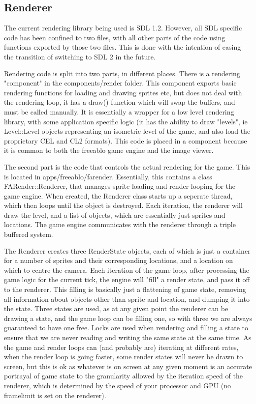 \documentclass[a4paper]{article}
\begin{document}
    \subsection{Renderer}
    The current rendering library being used is SDL 1.2. However, all SDL specific code has been confined to two files, with all other parts of the code using functions exported by those two files. This is done with the intention of easing the transition of switching to SDL 2 in the future.
    
    Rendering code is split into two parts, in different places. There is a rendering "component" in the components/render folder.
    This component exports basic rendering functions for loading and drawing sprites etc, but does not deal with the rendering loop, it has a draw() function which will swap the buffers, and must be called manually.   
    It is essentially a wrapper for a low level rendering library, with some application specific logic (it has the ability to draw "levels", ie Level::Level objects representing an isometric level of the game, and also load the proprietary CEL and CL2 formats).
    This code is placed in a component because it is common to both the freeablo game engine and the image viewer.
    
    \mbox{}
    
    The second part is the code that controls the actual rendering for the game. This is located in apps/freeablo/farender. Essentially, this contains a class FARender::Renderer, that manages sprite loading and render looping for the game engine.  
    When created, the Renderer class starts up a seperate thread, which then loops until the object is destroyed. Each iteration, the renderer will draw the level, and a list of objects, which are essentially just sprites and locations.
    The game engine communicates with the renderer through a triple buffered system.
    
    The Renderer creates three RenderState objects, each of which is just a container for a number of sprites and their corresponding locations, and a location on which to centre the camera.
    Each iteration of the game loop, after processing the game logic for the current tick, the engine will "fill" a render state, and pass it off to the renderer. This filling is basically just a flattening of game state, removing all information about objects other than sprite and location, and dumping it into the state.
    Three states are used, as at any given point the renderer can be drawing a state, and the game loop can be filling one, so with three we are always guaranteed to have one free.
    Locks are used when rendering and filling a state to ensure that we are never reading and writing the same state at the same time.
    As the game and render loops can (and probably are) iterating at different rates, when the render loop is going faster, some render states will never be drawn to screen, but this is ok as whatever is on screen at any given moment is an accurate portrayal of game state to the granularity allowed by the iteration speed of the renderer, which is determined by the speed of your processor and GPU (no framelimit is set on the renderer).
        
\end{document}
